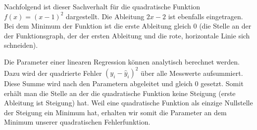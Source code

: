 \documentclass[letterpaper,10pt,english]{jupyterBook}
\begin{document}
\sphinxAtStartPar
Nachfolgend ist dieser Sachverhalt für die quadratische Funktion \(f(x) = (x-1)^2\) dargestellt. Die Ableitung
\(2x-2\) ist ebenfalls eingetragen. Bei dem Minimum der Funktion ist die erste Ableitung gleich \(0\) (die Stelle an der der Funktionsgraph, der der ersten Ableitung und die rote, horizontale Linie sich schneiden).

\noindent{}

\sphinxAtStartPar
Die Parameter einer linearen Regression können analytisch berechnet werden. Dazu wird der quadrierte Fehler \((y_i-\hat{y}_i)^2\) über alle Messwerte aufsummiert. Diese Summe wird nach den Parametern abgeleitet und gleich \(0\) gesetzt. Somit erhält man die Stelle an der die quadratische Funktion keine Steigung (erste Ableitung ist Steigung) hat. Weil eine quadratische Funktion als einzige Nullstelle der Steigung ein Minimum hat, erhalten wir somit die Parameter an dem Minimum unserer quadratischen Fehlerfunktion.
\end{document}
